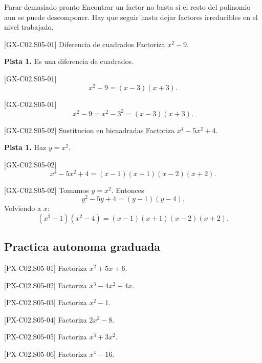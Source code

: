 \begin{commonerror}{Parar demasiado pronto}
Encontrar un factor no basta si el resto del polinomio aun se puede descomponer. Hay que seguir
hasta dejar factores irreducibles en el nivel trabajado.
\end{commonerror}

\begin{guidedexercise}{[GX-C02.S05-01] Diferencia de cuadrados}
Factoriza \(x^2-9\).

\textbf{Pista 1.} Es una diferencia de cuadrados.
\end{guidedexercise}

\begin{shortanswer}{[GX-C02.S05-01]}
\[
x^2-9=(x-3)(x+3).
\]
\end{shortanswer}

\begin{fullsolution}{[GX-C02.S05-01]}
\[
x^2-9=x^2-3^2=(x-3)(x+3).
\]
\end{fullsolution}

\begin{guidedexercise}{[GX-C02.S05-02] Sustitucion en bicuadradas}
Factoriza \(x^4-5x^2+4\).

\textbf{Pista 1.} Haz \(y=x^2\).
\end{guidedexercise}

\begin{shortanswer}{[GX-C02.S05-02]}
\[
x^4-5x^2+4=(x-1)(x+1)(x-2)(x+2).
\]
\end{shortanswer}

\begin{fullsolution}{[GX-C02.S05-02]}
Tomamos \(y=x^2\). Entonces
\[
y^2-5y+4=(y-1)(y-4).
\]
Volviendo a \(x\):
\[
(x^2-1)(x^2-4)=(x-1)(x+1)(x-2)(x+2).
\]
\end{fullsolution}

\subsection*{Practica autonoma graduada}
\begin{exercise}{[PX-C02.S05-01] Factoriza \(x^2+5x+6\).}
\end{exercise}
\begin{exercise}{[PX-C02.S05-02] Factoriza \(x^3-4x^2+4x\).}
\end{exercise}
\begin{exercise}{[PX-C02.S05-03] Factoriza \(x^2-1\).}
\end{exercise}
\begin{exercise}{[PX-C02.S05-04] Factoriza \(2x^2-8\).}
\end{exercise}
\begin{exercise}{[PX-C02.S05-05] Factoriza \(x^3+3x^2\).}
\end{exercise}
\begin{exercise}{[PX-C02.S05-06] Factoriza \(x^4-16\).}
\end{exercise}

